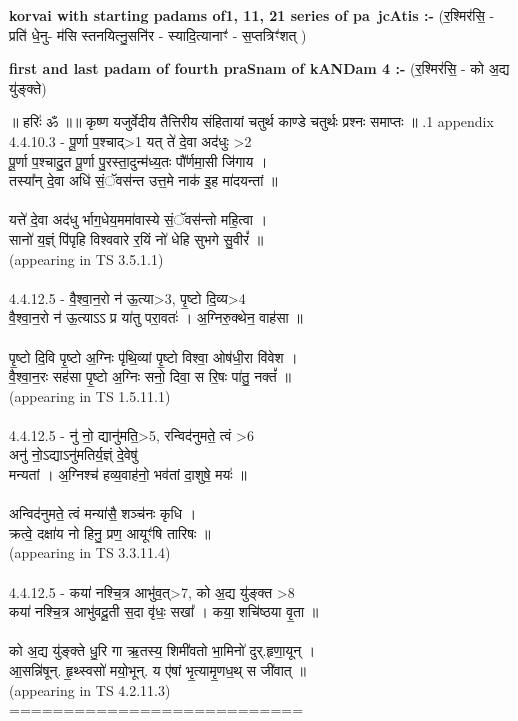 \documentclass[17pt]{extarticle}
\begin{document}
        \textbf{korvai with starting padams of1, 11, 21 series of pa~jcAtis :-} \newline
        (र॒श्मिर॑सि॒ - प्रति॑ धे॒नु- म॑सि स्तनयित्नु॒सनि॑र - स्यादि॒त्यानाꣳ॑ - स॒प्तत्रिꣳ॑शत् ) \newline

        \textbf{first and last padam of fourth praSnam of kANDam 4 :-} \newline
        (र॒श्मिर॑सि॒ - को अ॒द्य यु॑ङ्क्ते) \newline 

        
        ॥ हरिः॑ ॐ ॥॥ कृष्ण यजुर्वेदीय तैत्तिरीय संहितायां चतुर्थ काण्डे चतुर्थः प्रश्नः समाप्तः ॥ \newline
        .1   appendix\\4.4.10.3 - पू॒र्णा प॒श्चाद्>1 यत् ते॑ दे॒वा अद॑धुः >2\\पू॒र्णा प॒श्चादु॒त पू॒र्णा पु॒रस्ता॒दुन्म॑ध्य॒तः पौ᳚र्णमा॒सी जि॑गाय । \\तस्या᳚न् दे॒वा अधि॑ सं॒ॅवस॑न्त उत्त॒मे नाक॑ इ॒ह मा॑दयन्तां ॥\\\\यत्ते॑ दे॒वा अद॑धु र्भाग॒धेय॒ममा॑वास्ये सं॒ॅवस॑न्तो महि॒त्वा । \\सानो॑ य॒ज्ञ्ं पि॑पृहि विश्ववारे र॒यिं नो॑ धेहि सुभगे सु॒वीरं᳚ ॥\\(appearing in TS 3.5.1.1)\\\\4.4.12.5 - वै॒श्वा॒न॒रो न॑ ऊ॒त्या>3, पृ॒ष्टो दि॒व्य>4\\वै॒श्वा॒न॒रो न॑ ऊ॒त्याऽऽ प्र या॑तु परा॒वतः॑ । अ॒ग्निरु॒क्थेन॒ वाह॑सा ॥\\\\पृ॒ष्टो दि॒वि पृ॒ष्टो अ॒ग्निः पृ॑थि॒व्यां पृ॒ष्टो विश्वा॒ ओष॑धी॒रा वि॑वेश । \\वै॒श्वा॒न॒रः सह॑सा पृ॒ष्टो अ॒ग्निः सनो॒ दिवा॒ स रि॒षः पा॑तु॒ नक्तं᳚ ॥\\(appearing in TS 1.5.11.1)\\\\4.4.12.5 - नु॑ नो॒ द्यानु॑मति॒>5, रन्विद॑नुमते॒ त्वं >6\\अनु॑ नो॒ऽद्याऽनु॑मतिर्य॒ज्ञ्ं दे॒वेषु॑ \\मन्यतां । अ॒ग्निश्च॑ हव्य॒वाह॑नो॒ भव॑तां दा॒शुषे॒ मयः॑ ॥ \\\\अन्विद॑नुमते॒ त्वं मन्या॑सै॒ शञ्च॑नः कृधि । \\क्रत्वे॒ दक्षा॑य नो हिनु॒ प्रण॒ आयूꣳ॑षि तारिषः ॥ \\(appearing in TS 3.3.11.4)\\\\4.4.12.5 - कया॑ नश्चि॒त्र आभु॑व॒त्>7, को अ॒द्य यु॑ङ्क्त >8\\कया॑ नश्चि॒त्र आभु॑वदू॒ती स॒दा वृ॑धः॒ सखा᳚ । कया॒ शचि॑ष्ठया वृ॒ता ॥ \\\\को अ॒द्य यु॑ङ्क्ते धु॒रि गा ऋ॒तस्य॒ शिमी॑वतो भा॒मिनो॑ दुर्.हृणा॒यून् । \\आ॒सन्नि॑षून्. हृ॒थ्स्वसो॑ मयो॒भून्. य ए॑षां भृ॒त्यामृ॒णध॒थ् स जी॑वात् ॥ \\(appearing in TS 4.2.11.3)\\===========================\\
                \pagebreak
        
\end{document}
